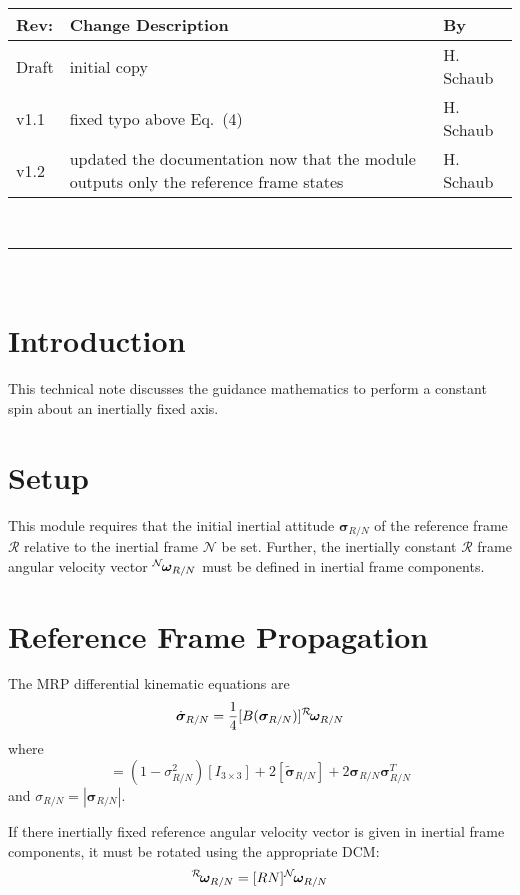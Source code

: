 \documentclass[]{AVSSimReportMemo}
\begin{document}
\makeCover


%
%
\pagestyle{empty}
{\renewcommand{\arraystretch}{1.1}
\noindent
\begin{longtable}{|p{0.5in}|p{4.5in}|p{1.14in}|}
\hline
{\bfseries Rev}: & {\bfseries Change Description} & {\bfseries By} \\
\hline
Draft & initial copy & H. Schaub \\
v1.1 & fixed typo above Eq.~(4) & H. Schaub \\
v1.2 & updated the documentation now that the module outputs only the reference frame states & H. Schaub \\
\hline

\end{longtable}
}

\newpage
\setcounter{page}{1}
\pagestyle{fancy}

\tableofcontents
~\\ \hrule ~\\


\section{Introduction}
This technical note discusses the guidance mathematics to perform a constant spin about an inertially fixed axis.  

\section{Setup}
This module requires that the initial inertial attitude $\bm\sigma_{R/N}$ of the reference frame $\mathcal{R}$ relative to the inertial frame $\mathcal{N}$ be set.  Further, the inertially constant $\mathcal{R}$ frame angular velocity vector $\leftexp{N}{\bm\omega}_{R/N}$ must be defined in inertial frame components.  




\section{Reference Frame Propagation}
The MRP differential kinematic equations are
\begin{equation}
	\dot{\bm\sigma}_{R/N} = \frac{1}{4} [B(\bm\sigma_{R/N})] \leftexp{R}{\bm\omega}_{R/N}
\end{equation}
where
\begin{equation}
	[B(\bm\sigma_{R/N})] = (1-\sigma_{R/N}^{2}) [I_{3\times 3}] + 2 [\tilde{\bm\sigma}_{R/N}] + 2 \bm\sigma_{R/N} \bm\sigma_{R/N}^{T}
\end{equation}
and $\sigma_{R/N} = |\bm\sigma_{R/N}|$.

If there inertially fixed reference angular velocity vector is given in inertial frame components, it must be rotated using the appropriate DCM:
\begin{equation}
	\leftexp{R}{\bm\omega_{R/N}} = [RN] \leftexp{N}{\bm\omega_{R/N}}
\end{equation}



\end{document}
